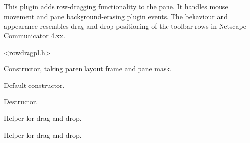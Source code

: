 %
%


\section{}\label{cbrowdragplugin}


This plugin adds row-dragging functionality to the pane.
It handles mouse movement and pane background-erasing plugin events.
The behaviour and appearance resembles drag and drop positioning
of the toolbar rows in Netscape Communicator 4.xx.




<rowdragpl.h>




\label{cbrowdragplugincbrowdragplugin}


Constructor, taking paren layout frame and pane mask.



Default constructor.


\label{cbrowdragplugindtor}


Destructor.


\label{cbrowdragplugincapturedcarea}


Helper for drag and drop.


\label{cbrowdragplugincheckpreviteminfocus}


Helper for drag and drop.


\label{cbrowdragpluginclone}

